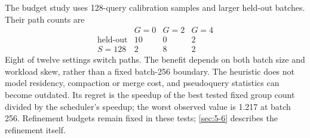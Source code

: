 The budget study uses 128-query calibration samples and larger held-out
batches. Their path counts are
\[
 \begin{array}{c|rrr}
 &G=0&G=2&G=4\\\hline
 \text{held-out}&10&0&2\\
 S=128&2&8&2
 \end{array}
\]
Eight of twelve settings switch paths. The benefit depends on both
batch size and workload skew, rather than a fixed batch-256 boundary.
The heuristic does not model residency, compaction or merge cost, and
pseudoquery statistics can become outdated. Its regret is the speedup
of the best tested fixed group count divided by the scheduler's speedup;
the worst observed value is 1.217 at batch 256. Refinement budgets remain
fixed in these tests; \cref{sec:5-6} describes the refinement itself.
